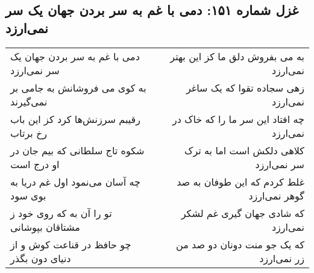 \begin{center}
\section*{غزل شماره ۱۵۱: دمی با غم به سر بردن جهان یک سر نمی‌ارزد}
\label{sec:sh151}
\begin{longtable}{l p{0.5cm} r}
دمی با غم به سر بردن جهان یک سر نمی‌ارزد
&&
به می بفروش دلق ما کز این بهتر نمی‌ارزد
\\
به کوی می فروشانش به جامی بر نمی‌گیرند
&&
زهی سجاده تقوا که یک ساغر نمی‌ارزد
\\
رقیبم سرزنش‌ها کرد کز این باب رخ برتاب
&&
چه افتاد این سر ما را که خاک در نمی‌ارزد
\\
شکوه تاج سلطانی که بیم جان در او درج است
&&
کلاهی دلکش است اما به ترک سر نمی‌ارزد
\\
چه آسان می‌نمود اول غم دریا به بوی سود
&&
غلط کردم که این طوفان به صد گوهر نمی‌ارزد
\\
تو را آن به که روی خود ز مشتاقان بپوشانی
&&
که شادی جهان گیری غم لشکر نمی‌ارزد
\\
چو حافظ در قناعت کوش و از دنیای دون بگذر
&&
که یک جو منت دونان دو صد من زر نمی‌ارزد
\\
\end{longtable}
\end{center}
